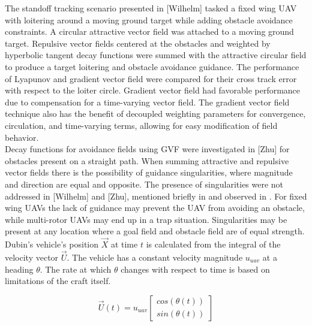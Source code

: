 \documentclass[conf]{new-aiaa}
\begin{document}
The standoff tracking scenario presented in [Wilhelm] tasked a fixed wing UAV with loitering around a moving ground target while adding obstacle avoidance constraints. A circular attractive vector field was attached to a moving ground target. Repulsive vector fields centered at the obstacles and weighted by hyperbolic tangent decay functions were summed with the attractive circular field to produce a target loitering and obstacle avoidance guidance. The performance of Lyapunov \cite{frew_cooperative_2007} and gradient vector field \cite{goncalves_artificial_2009,goncalves_circulation_2010,goncalves_vector_2010} were compared for their cross track error with respect to the loiter circle. Gradient vector field had favorable performance due to compensation for a time-varying vector field. The gradient vector field technique also has the benefit of decoupled weighting parameters for convergence, circulation, and time-varying terms, allowing for easy modification of field behavior. \\

Decay functions for avoidance fields using GVF were investigated in [Zhu] for obstacles present on a straight path. When summing attractive and repulsive vector fields there is the possibility of guidance singularities, where magnitude and direction are equal and opposite. The presence of singularities were not addressed in [Wilhelm] and [Zhu], mentioned briefly in \cite{nelson_cooperative_2005} and observed in \cite{panagou_motion_2014}. For fixed wing UAVs the lack of guidance may prevent the UAV from avoiding an obstacle, while multi-rotor UAVs may end up in a trap situation. Singularities may be present at any location where a goal field and obstacle field are of equal strength. \\



Dubin's vehicle's position $\overrightarrow{X}$ at time $t$ is calculated from the integral of the velocity vector $\overrightarrow{U}$. The vehicle has a constant velocity magnitude $u_{uav}$ at a heading $\theta$. The rate at which $\theta$ changes with respect to time is based on limitations of the craft itself. 


\begin{equation}
\label{uavVelocity}
\overrightarrow{U}(t) = u_{uav} \begin{bmatrix}
cos(\theta(t)) \\
sin(\theta(t))
\end{bmatrix}
\end{equation}
\end{document}
